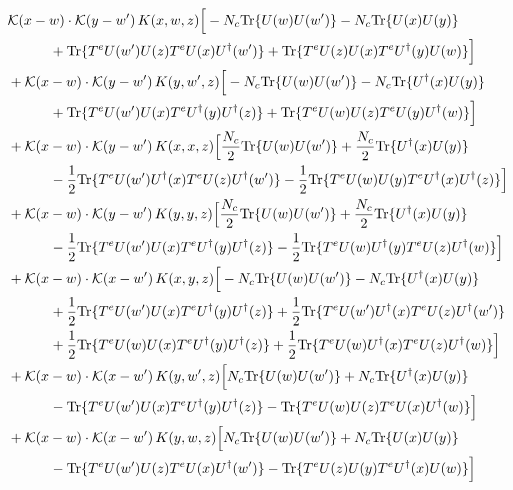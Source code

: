 \documentclass[10pt]{article}
\numberwithin{equation}{section}
\begin{document}
\begin{align}
&\mathcal K(x-w)\cdot\mathcal K(y-w')\,K(x,w,z)\Big[-N_c{\rm Tr}\{U(w)U(w')\}-N_c{\rm Tr}\{U(x)U(y)\}\notag\\
&\quad\quad\quad+{\rm Tr}\{T^eU(w')U(z)T^eU(x)U^\dagger(w')\}+{\rm Tr}\{T^eU(z)U(x)T^eU^\dagger(y)U(w)\}\Big]\notag\\
&+\mathcal K(x-w)\cdot\mathcal K(y-w')\,K(y,w',z)\Big[-N_c{\rm Tr}\{U(w)U(w')\}-N_c{\rm Tr}\{U^\dagger(x)U(y)\}\notag\\
&\quad\quad\quad+{\rm Tr}\{T^eU(w')U(x)T^eU^\dagger(y)U^\dagger(z)\}+{\rm Tr}\{T^eU(w)U(z)T^eU(y)U^\dagger(w)\}\Big]\notag\\
&+\mathcal K(x-w)\cdot\mathcal K(y-w')\,K(x,x,z)\Big[\frac{N_c}{2}{\rm Tr}\{U(w)U(w')\}+\frac{N_c}{2}{\rm Tr}\{U^\dagger(x)U(y)\}\notag\\
&\quad\quad\quad-\frac{1}{2}{\rm Tr}\{T^eU(w')U^\dagger(x)T^eU(z)U^\dagger(w')\}-\frac{1}{2}{\rm Tr}\{T^eU(w)U(y)T^eU^\dagger(x)U^\dagger(z)\}\Big]\notag\\
&+\mathcal K(x-w)\cdot\mathcal K(y-w')\,K(y,y,z)\Big[\frac{N_c}{2}{\rm Tr}\{U(w)U(w')\}+\frac{N_c}{2}{\rm Tr}\{U^\dagger(x)U(y)\}\notag\\
&\quad\quad\quad-\frac{1}{2}{\rm Tr}\{T^eU(w')U(x)T^eU^\dagger(y)U^\dagger(z)\}-\frac{1}{2}{\rm Tr}\{T^eU(w)U^\dagger(y)T^eU(z)U^\dagger(w)\}\Big]\notag\\
&+\mathcal K(x-w)\cdot\mathcal K(x-w')\,K(x,y,z)\Big[-N_c{\rm Tr}\{U(w)U(w')\}-N_c{\rm Tr}\{U^\dagger(x)U(y)\}\notag\\
&\quad\quad\quad+\frac{1}{2}{\rm Tr}\{T^eU(w')U(x)T^eU^\dagger(y)U^\dagger(z)\}+\frac{1}{2}{\rm Tr}\{T^eU(w')U^\dagger(x)T^eU(z)U^\dagger(w')\}\notag\\
&\quad\quad\quad+\frac{1}{2}{\rm Tr}\{T^eU(w)U(x)T^eU^\dagger(y)U^\dagger(z)\}+\frac{1}{2}{\rm Tr}\{T^eU(w)U^\dagger(x)T^eU(z)U^\dagger(w)\}\Big]\notag\\
&+\mathcal K(x-w)\cdot\mathcal K(x-w')\,K(y,w',z)\Big[N_c{\rm Tr}\{U(w)U(w')\}+N_c{\rm Tr}\{U^\dagger(x)U(y)\}\notag\\
&\quad\quad\quad-{\rm Tr}\{T^eU(w')U(x)T^eU^\dagger(y)U^\dagger(z)\}-{\rm Tr}\{T^eU(w)U(z)T^eU(x)U^\dagger(w)\}\Big]\notag\\
&+\mathcal K(x-w)\cdot\mathcal K(x-w')\,K(y,w,z)\Big[N_c{\rm Tr}\{U(w)U(w')\}+N_c{\rm Tr}\{U(x)U(y)\}\notag\\
&\quad\quad\quad-{\rm Tr}\{T^eU(w')U(z)T^eU(x)U^\dagger(w')\}-{\rm Tr}\{T^eU(z)U(y)T^eU^\dagger(x)U(w)\}\Big]
\label{eq:list13}
\end{align}
\end{document}
